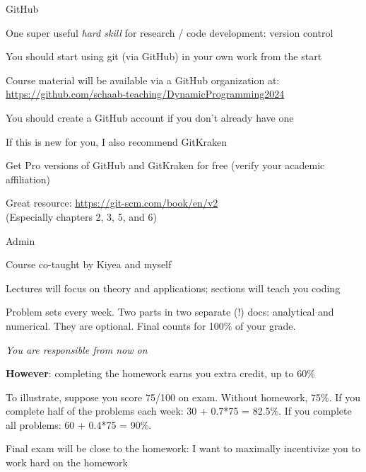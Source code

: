 \documentclass[11pt, aspectratio=169]{beamer}
\newenvironment{witemize}{\itemize\addtolength{\itemsep}{10pt}}{\enditemize}
\begin{document}
\begin{frame}{GitHub}
\begin{witemize}
\item One super useful \textit{hard skill} for research / code development: version control

\item You should start using git (via GitHub) in your own work from the start

\item Course material will be available via a GitHub organization at:
\url{https://github.com/schaab-teaching/DynamicProgramming2024}

\item You should create a GitHub account if you don't already have one

\item If this is new for you, I also recommend GitKraken

\item Get Pro versions of GitHub and GitKraken for free (verify your academic affiliation)

\item Great resource: \url{https://git-scm.com/book/en/v2} \\
(Especially chapters 2, 3, 5, and 6)

\end{witemize}
\end{frame}


\begin{frame}{Admin}
\begin{witemize}
\item Course co-taught by Kiyea and myself

\item Lectures will focus on theory and applications; sections will teach you coding

\item Problem sets every week. Two parts in two separate (!) docs: analytical and numerical. They are optional. Final counts for 100\% of your grade. 

{\footnotesize \textit{You are responsible from now on}}

\item {\color{blue} \textbf{However}}: completing the homework earns you extra credit, up to 60\%

{\footnotesize To illustrate, suppose you score 75/100 on exam. Without homework, 75\%. If you complete half of the problems each week: 30 + 0.7*75 = 82.5\%. If you complete all problems: 60 + 0.4*75 = 90\%.} 

\item Final exam will be close to the homework: I want to maximally incentivize you to work hard on the homework

\end{witemize}
\end{frame}
\end{document}
